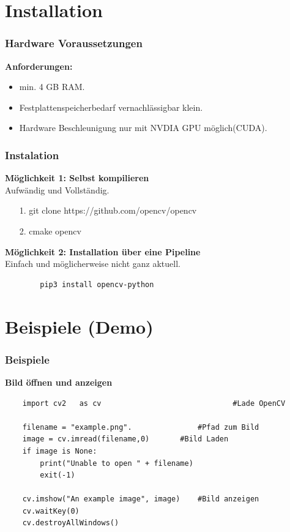 \documentclass{beamer}
\begin{document}
\section{Installation}
\begin{frame} \frametitle{Hardware Voraussetzungen}
	\textbf{Anforderungen: }
	\begin{itemize}
		\item  min. 4 GB RAM.
		\item Festplattenspeicherbedarf vernachlässigbar klein.  
		\item Hardware Beschleunigung nur mit NVDIA GPU möglich(CUDA).
	\end{itemize}
\end{frame}

\begin{frame} [fragile]
\frametitle{Instalation}
	\textbf{Möglichkeit 1: Selbst kompilieren}\\
	Aufwändig und Vollständig.
		\begin{itemize}
			\item  [1.] git clone https://github.com/opencv/opencv
			\item [2.] cmake opencv
		\end{itemize}
	\textbf{Möglichkeit 2: Installation über eine Pipeline}\\
	Einfach und möglicherweise nicht ganz aktuell.\\
\lstset{style=myStyle}
\begin{lstlisting}
		pip3 install opencv-python 
\end{lstlisting}
\cite{Howse2015}
\end{frame}

\section{Beispiele (Demo)}
\begin{frame} [fragile]
\frametitle{Beispiele}
	\textbf{Bild öffnen und anzeigen}\\
\lstset{style=myStyle}
	\begin{lstlisting}
	import cv2   as cv								#Lade OpenCV
	
	filename = "example.png". 				#Pfad zum Bild 
	image = cv.imread(filename,0)  		#Bild Laden
	if image is None:               
		print("Unable to open " + filename)
		exit(-1)

	cv.imshow("An example image", image)    #Bild anzeigen
	cv.waitKey(0)
	cv.destroyAllWindows()
	\end{lstlisting}
	\cite{Howse2015}
\end{frame}
\end{document}
